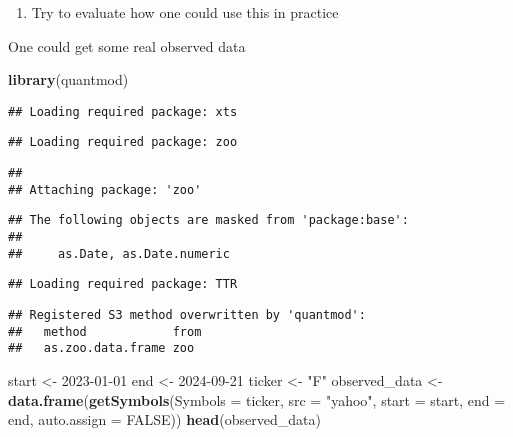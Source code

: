 \documentclass[
]{article}
\newenvironment{Shaded}{\begin{snugshade}}{\end{snugshade}}
\newcommand{\AttributeTok}[1]{\textcolor[rgb]{0.13,0.29,0.53}{#1}}
\newcommand{\ConstantTok}[1]{\textcolor[rgb]{0.56,0.35,0.01}{#1}}
\newcommand{\DecValTok}[1]{\textcolor[rgb]{0.00,0.00,0.81}{#1}}
\newcommand{\FunctionTok}[1]{\textcolor[rgb]{0.13,0.29,0.53}{\textbf{#1}}}
\newcommand{\NormalTok}[1]{#1}
\newcommand{\OtherTok}[1]{\textcolor[rgb]{0.56,0.35,0.01}{#1}}
\newcommand{\StringTok}[1]{\textcolor[rgb]{0.31,0.60,0.02}{#1}}
\providecommand{\tightlist}{%
  \setlength{\itemsep}{0pt}\setlength{\parskip}{0pt}}
\begin{document}
\begin{enumerate}
\def\labelenumi{\arabic{enumi}.}
\setcounter{enumi}{4}
\tightlist
\item
  Try to evaluate how one could use this in practice
\end{enumerate}

One could get some real observed data

\begin{Shaded}
\begin{Highlighting}[]
\FunctionTok{library}\NormalTok{(quantmod)}
\end{Highlighting}
\end{Shaded}

\begin{verbatim}
## Loading required package: xts
\end{verbatim}

\begin{verbatim}
## Loading required package: zoo
\end{verbatim}

\begin{verbatim}
## 
## Attaching package: 'zoo'
\end{verbatim}

\begin{verbatim}
## The following objects are masked from 'package:base':
## 
##     as.Date, as.Date.numeric
\end{verbatim}

\begin{verbatim}
## Loading required package: TTR
\end{verbatim}

\begin{verbatim}
## Registered S3 method overwritten by 'quantmod':
##   method            from
##   as.zoo.data.frame zoo
\end{verbatim}

\begin{Shaded}
\begin{Highlighting}[]
\NormalTok{start }\OtherTok{\textless{}{-}} \DecValTok{2023{-}01{-}01}
\NormalTok{end }\OtherTok{\textless{}{-}} \DecValTok{2024{-}09{-}21}
\NormalTok{ticker }\OtherTok{\textless{}{-}} \StringTok{"F"}
\NormalTok{observed\_data }\OtherTok{\textless{}{-}} \FunctionTok{data.frame}\NormalTok{(}\FunctionTok{getSymbols}\NormalTok{(}\AttributeTok{Symbols =}\NormalTok{ ticker, }\AttributeTok{src =} \StringTok{"yahoo"}\NormalTok{, }\AttributeTok{start =}\NormalTok{ start, }\AttributeTok{end =}\NormalTok{ end, }\AttributeTok{auto.assign =} \ConstantTok{FALSE}\NormalTok{))}
\FunctionTok{head}\NormalTok{(observed\_data)}
\end{Highlighting}
\end{Shaded}
\end{document}
